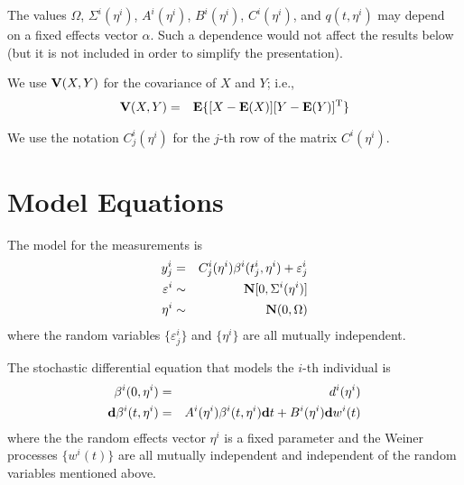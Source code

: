 \documentclass{article}
\newcommand{\BE}{{\bf E}}
\newcommand{\BN}{{\bf N}}
\newcommand{\RT}{{\rm T}}
\newcommand{\BV}{{\bf V}}
\newcommand{\Bd}{{\bf d}}
\newcommand{\Th}[1]{{\( #1 \)}-th}
\begin{document}
\bigskip
\noindent
The values
\( \Omega \),
\( \Sigma^i ( \eta^i ) \), 
\( A^i ( \eta^i ) \), 
\( B^i( \eta^i ) \), 
\( C^i ( \eta^i ) \), 
and
\( q( t, \eta^i ) \)
may depend on a fixed effects vector \( \alpha \).
Such a dependence would not
affect the results below
(but it is not included in order to simplify the presentation).

\bigskip
\noindent
We use \( \BV ( X , Y ) \) for the covariance of \( X \) and \( Y \); i.e.,
\begin{eqnarray*}
\BV ( X , Y ) & = & \BE \{ [ X - \BE (X) ] [ Y - \BE (Y) ]^\RT \}
\end{eqnarray*}

\bigskip
\noindent
We use the notation \( C^i_j ( \eta^i ) \) for the \Th{j}
row of the matrix \( C^i ( \eta^i ) \).

\section{Model Equations}
The model for the measurements is
\begin{eqnarray*}
y_j^i           & = &  
C^i_j (  \eta^i ) \beta^i ( t_j^i , \eta^i ) + \varepsilon_j^i
\\
\varepsilon^i   & \sim & \BN [ 0 , \Sigma^i ( \eta^i ) ]
\\
\eta^i          & \sim & \BN ( 0 , \Omega )
\end{eqnarray*}
where the random variables \( \{ \varepsilon_j^i \} \) and \( \{ \eta^i \} \)
are all mutually independent. 

\bigskip
\noindent
The stochastic differential equation that models 
the \Th{i} individual is
\begin{eqnarray*}
\beta^i (0, \eta^i ) 
& = & d^i ( \eta^i )
\\
\Bd \beta^i (t, \eta^i ) 
& = & 
A^i (  \eta^i ) \beta^i (t, \eta^i ) \Bd t + B^i (  \eta^i ) \Bd w^i (t)
\end{eqnarray*}
where the the random effects vector \( \eta^i \) is a fixed parameter and
the Weiner processes \( \{ w^i (t) \} \)
are all mutually independent and independent of the random variables
mentioned above. 
\end{document}
